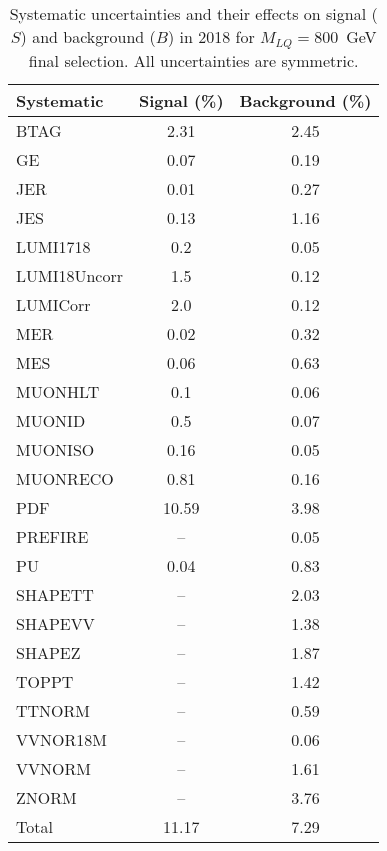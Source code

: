 \begin{table}[htbp]
\begin{center}
\caption{Systematic uncertainties and their effects on signal ($S$) and background ($B$) in 2018 for $M_{LQ}=800$~GeV final selection. All uncertainties are symmetric.}
\begin{tabular}{lcc}
\hline\hline
Systematic & Signal (\%) & Background (\%) \\ \hline 
BTAG & 2.31 & 2.45\\ 
GE & 0.07 & 0.19\\ 
JER & 0.01 & 0.27\\ 
JES & 0.13 & 1.16\\ 
LUMI1718 & 0.2 & 0.05\\ 
LUMI18Uncorr & 1.5 & 0.12\\ 
LUMICorr & 2.0 & 0.12\\ 
MER & 0.02 & 0.32\\ 
MES & 0.06 & 0.63\\ 
MUONHLT & 0.1 & 0.06\\ 
MUONID & 0.5 & 0.07\\ 
MUONISO & 0.16 & 0.05\\ 
MUONRECO & 0.81 & 0.16\\ 
PDF & 10.59 & 3.98\\ 
PREFIRE & -- & 0.05\\ 
PU & 0.04 & 0.83\\ 
SHAPETT & -- & 2.03\\ 
SHAPEVV & -- & 1.38\\ 
SHAPEZ & -- & 1.87\\ 
TOPPT & -- & 1.42\\ 
TTNORM & -- & 0.59\\ 
VVNOR18M & -- & 0.06\\ 
VVNORM & -- & 1.61\\ 
ZNORM & -- & 3.76\\ 
Total & 11.17 & 7.29\\ \hline \hline
\end{tabular}
\label{tab:SysUncertainties_uujj_800}
\end{center}
\end{table}

